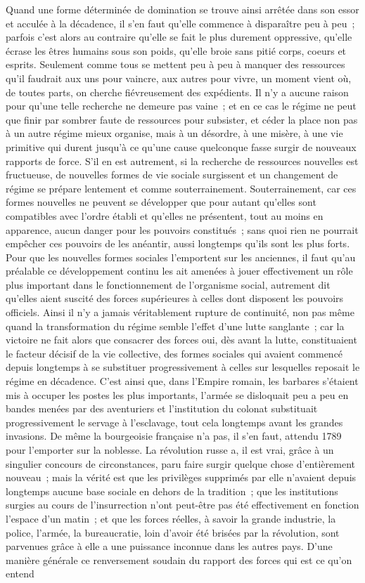 \documentclass[french,twoside]{book} %
\begin{document}
Quand une forme déterminée de domination se trouve ainsi arrêtée dans son essor et acculée à la décadence, il s'en faut qu'elle commence à disparaître peu à peu ; parfois c'est alors au contraire qu'elle se fait le plus durement oppressive, qu'elle écrase les êtres humains sous son poids, qu'elle broie sans pitié corps, coeurs et esprits. Seulement comme tous se mettent peu à peu à manquer des ressources qu'il faudrait aux uns pour vaincre, aux autres pour vivre, un moment vient où, de toutes parts, on cherche fiévreusement des expédients. Il n'y a aucune raison pour qu'une telle recherche ne demeure pas vaine ; et en ce cas le régime ne peut que finir par sombrer faute de ressources pour subsister, et céder la place non pas à un autre régime mieux organise, mais à un désordre, à une misère, à une vie primitive qui durent jusqu'à ce qu'une cause quelconque fasse surgir de nouveaux rapports de force. S'il en est autrement, si la recherche de ressources nouvelles est fructueuse, de nouvelles formes de vie sociale surgissent et un changement de régime se prépare lentement et comme souterrainement. Souterrainement, car ces formes nouvelles ne peuvent se développer que pour autant qu'elles sont compatibles avec l'ordre établi et qu'elles ne présentent, tout au moins en apparence, aucun danger pour les pouvoirs constitués ; sans quoi rien ne pourrait empêcher ces pouvoirs de les anéantir, aussi longtemps qu'ils sont les plus forts. Pour que les nouvelles formes sociales l'emportent sur les anciennes, il faut qu'au préalable ce développement continu les ait amenées à jouer effectivement un rôle plus important dans le fonctionnement de l'organisme social, autrement dit qu'elles aient suscité des forces supérieures à celles dont disposent les pouvoirs officiels. Ainsi il n'y a jamais véritablement rupture de continuité, non pas même quand la transformation du régime semble l'effet d'une lutte sanglante ; car la victoire ne fait alors que consacrer des forces oui, dès avant la lutte, constituaient le facteur décisif de la vie collective, des formes sociales qui avaient commencé depuis longtemps à se substituer progressivement à celles sur lesquelles reposait le régime en décadence. C'est ainsi que, dans l'Empire romain, les barbares s'étaient mis à occuper les postes les plus importants, l'armée se disloquait peu a peu en bandes menées par des aventuriers et l'institution du colonat substituait progressivement le servage à l'esclavage, tout cela longtemps avant les grandes invasions. De même la bourgeoisie française n'a pas, il s'en faut, attendu 1789 pour l'emporter sur la noblesse. La révolution russe a, il est vrai, grâce à un singulier concours de circonstances, paru faire surgir quelque chose d'entièrement nouveau ; mais la vérité est que les privilèges supprimés par elle n'avaient depuis longtemps aucune base sociale en dehors de la tradition ; que les institutions surgies au cours de l'insurrection n'ont peut-être pas été effectivement en fonction l'espace d'un matin ; et que les forces réelles, à savoir la grande industrie, la police, l'armée, la bureaucratie, loin d'avoir été brisées par la révolution, sont parvenues grâce à elle a une puissance inconnue dans les autres pays. D'une manière générale ce renversement soudain du rapport des forces qui est ce qu'on entend 
\end{document}
